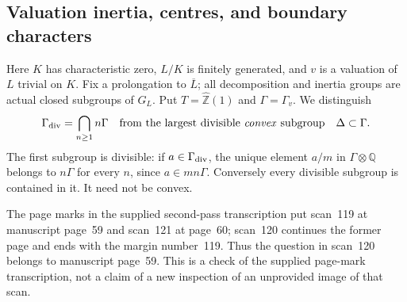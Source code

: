 \subsection{Valuation inertia, centres, and boundary characters}

Here $K$ has characteristic zero, $L/K$ is finitely generated, and $v$
is a valuation of $L$ trivial on $K$.  Fix a prolongation to
$\overline L$; all decomposition and inertia groups are actual closed
subgroups of $G_L$.  Put $T=\widehat{\mathbb Z}(1)$ and
$\Gamma=\Gamma_v$.  We distinguish
\[
 \Gamma_{\rm div}=\bigcap_{n\geq1}n\Gamma
 \quad\hbox{from the largest divisible \emph{convex} subgroup}
 \quad\Delta\subset\Gamma.
\]
The first subgroup is divisible: if $a\in\Gamma_{\rm div}$, the
unique element $a/m$ in $\Gamma\otimes\mathbb Q$ belongs to
$n\Gamma$ for every $n$, since $a\in mn\Gamma$.  Conversely every
divisible subgroup is contained in it.  It need not be convex.

The page marks in the supplied second-pass transcription put scan~119
at manuscript page~59 and scan~121 at page~60; scan~120 continues the
former page and ends with the margin number~119.  Thus the question
in scan~120 belongs to manuscript page~59.  This is a check of the
supplied page-mark transcription, not a claim of a new inspection of an
unprovided image of that scan.

